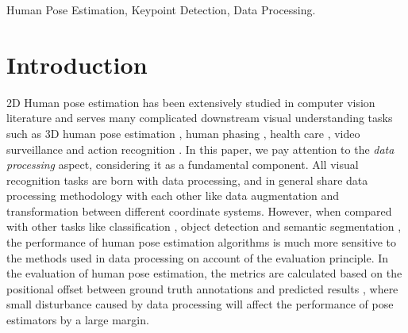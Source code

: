 \documentclass[10pt,journal,compsoc]{IEEEtran}
\begin{document}
{\begin{IEEEkeywords}
Human Pose Estimation, Keypoint Detection, Data Processing.
\end{IEEEkeywords}}


\maketitle


\IEEEdisplaynontitleabstractindextext




\IEEEpeerreviewmaketitle


\section{Introduction}
\renewcommand{\thefootnote}{}

2D Human pose estimation has been extensively studied in computer vision literature and serves many complicated downstream visual understanding tasks such as 3D human pose estimation \cite{human36m,ci2020locally,luvizon2020multi,3d8611195,R3D,MonoCap}, human phasing \cite{liang2018look,HumanParsing}, health care \cite{VBE,chen2020fall,chen2018patient}, video surveillance \cite{li2019state,zhang2019exploiting,andriluka2018posetrack,Girdhar_2018_CVPR} and action recognition \cite{carreira2017quo, zhu2019action, zhu2019convolutional,luvizon2020multi}. In this paper, we pay attention to the \textit{data processing} aspect, considering it as a fundamental component. All visual recognition tasks are born with data processing, and in general share data processing methodology with each other like data augmentation and transformation between different coordinate systems. However, when compared with other tasks like classification \cite{ImageNet}, object detection \cite{COCO} and semantic segmentation \cite{mottaghi2014role,cordts2016cityscapes}, the performance of human pose estimation algorithms is much more sensitive to the methods used in data processing on account of the evaluation principle. In the evaluation of human pose estimation, the metrics are calculated based on the positional offset between ground truth annotations and predicted results \cite{COCO,MPII}, where small disturbance caused by data processing will affect the performance of pose estimators by a large margin.
\end{document}
